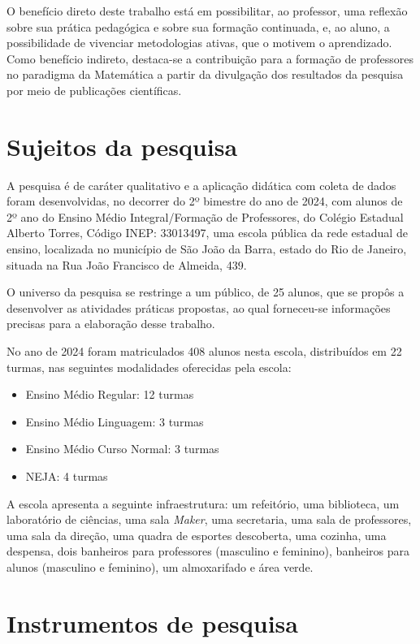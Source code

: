 O benefício direto deste trabalho está em possibilitar, ao professor, uma reflexão sobre sua prática pedagógica e sobre sua formação continuada,  e, ao aluno, a possibilidade de vivenciar metodologias ativas, que o motivem o aprendizado. Como benefício indireto, destaca-se a contribuição para a formação de professores no paradigma da Matemática a partir da divulgação dos resultados da pesquisa por meio de publicações científicas.

\section{Sujeitos da pesquisa}

A pesquisa é de caráter qualitativo e a aplicação didática com coleta de dados foram desenvolvidas, no decorrer do 2º bimestre do ano de 2024, com alunos de 2º ano do Ensino Médio Integral/Formação de Professores, do Colégio Estadual Alberto Torres, Código INEP: 33013497, uma escola pública da rede estadual de ensino, localizada no município de São João da Barra, estado do Rio de Janeiro, situada na Rua João Francisco de Almeida, 439.

O universo da pesquisa se restringe a um público, de 25 alunos, que se propôs a desenvolver as atividades práticas propostas, ao qual forneceu-se informações precisas para a elaboração desse trabalho.

No ano de 2024 foram matriculados 408 alunos nesta escola, distribuídos em 22 turmas, nas seguintes modalidades oferecidas pela escola:

\begin{itemize}
    \item Ensino Médio Regular: 12 turmas
    \item Ensino Médio Linguagem: 3 turmas
    \item Ensino Médio Curso Normal: 3 turmas
    \item NEJA: 4 turmas
\end{itemize}

A escola apresenta a seguinte infraestrutura: um refeitório, uma biblioteca, um laboratório de ciências, uma sala \textit{Maker}, uma secretaria, uma sala de  professores, uma sala da direção, uma quadra de esportes descoberta, uma cozinha, uma despensa, dois banheiros para professores (masculino e feminino), banheiros para alunos (masculino e feminino), um almoxarifado e área verde.

\section{Instrumentos de pesquisa}


